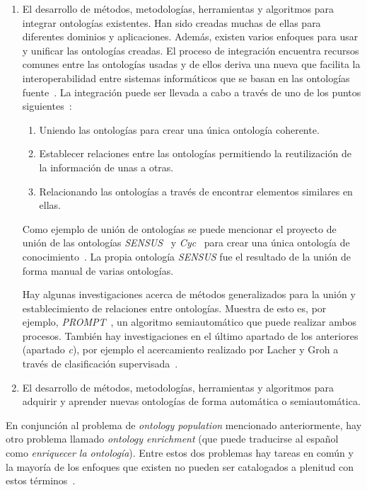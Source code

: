\begin{enumerate}
	\item El desarrollo de métodos, metodologías, herramientas y algoritmos para integrar ontologías existentes. Han sido creadas muchas de ellas para diferentes dominios y aplicaciones. Además, existen varios enfoques para usar y unificar las ontologías creadas. El proceso de integración encuentra recursos comunes entre las ontologías usadas y de ellos deriva una nueva que facilita la interoperabilidad entre sistemas informáticos que se basan en las ontologías fuente~\cite{ref:38}. La integración puede ser llevada a cabo a través de uno de los puntos siguientes~\cite{ref:39}:

	\begin{enumerate}
		\item Uniendo las ontologías para crear una única ontología coherente.
		\item Establecer relaciones entre las ontologías permitiendo la reutilización de la información de unas a otras.
		\item Relacionando las ontologías a través de encontrar elementos similares en ellas.
	\end{enumerate}

	Como ejemplo de unión de ontologías se puede mencionar el proyecto de unión de las ontologías \textit{SENSUS}~\cite{ref:40} y \textit{Cyc}~\cite{ref:41} para crear una única ontología de conocimiento~\cite{ref:42}. La propia ontología \textit{SENSUS} fue el resultado de la unión de forma manual de varias ontologías.

	Hay algunas investigaciones acerca de métodos generalizados para la unión y establecimiento de relaciones entre ontologías. Muestra de esto es, por ejemplo, \textit{PROMPT}~\cite{ref:43}, un algoritmo semiautomático que puede realizar ambos procesos. También hay investigaciones en el último apartado de los anteriores (apartado \textit{c}), por ejemplo el acercamiento realizado por Lacher y Groh a través de clasificación supervisada~\cite{ref:44}.

	\item El desarrollo de métodos, metodologías, herramientas y algoritmos para adquirir y aprender nuevas ontologías de forma automática o semiautomática.
\end{enumerate}

En conjunción al problema de \textit{ontology population} mencionado anteriormente, hay otro problema llamado \textit{ontology enrichment} (que puede traducirse al español como \textit{enriquecer la ontología}). Entre estos dos problemas hay tareas en común y la mayoría de los enfoques que existen no pueden ser catalogados a plenitud con estos términos~\cite{ref:34}.

